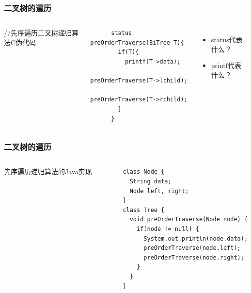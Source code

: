 \begin{frame}[fragile]
  \frametitle{二叉树的遍历}
  \begin{columns}[T]
    //先序遍历二叉树递归算法C伪代码
    \begin{verbatim}
      status preOrderTraverse(BiTree T){
        if(T){
          printf(T->data);
          preOrderTraverse(T->lchild);
          preOrderTraverse(T->rchild);
        }
      }
    \end{verbatim}
    \begin{itemize}
    \item status代表什么？
    \item printf代表什么？
    \end{itemize}

  \end{columns}
\end{frame}


\begin{frame}[fragile]
  \frametitle{二叉树的遍历}
  \begin{columns}[T]
    先序遍历递归算法的Java实现
  
    \begin{verbatim}
      class Node {
        String data;
        Node left, right;
      }
      class Tree {
        void preOrderTraverse(Node node) {
          if(node != null) {
            System.out.println(node.data);
            preOrderTraverse(node.left);
            preOrderTraverse(node.right);
          }
        }
      }
    \end{verbatim}

  \end{columns}
\end{frame}

